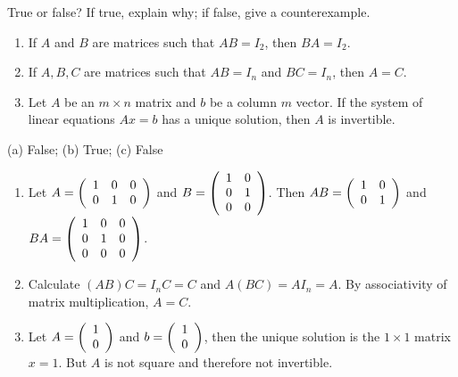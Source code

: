 \documentclass{ximera}
\author{YOUR NAME}
\begin{document}

\begin{exercise}\label{c4.9.3b.2}

True or false? If true, explain why; if false, give a counterexample.
\begin{enumerate}
\item If $A$ and $B$ are matrices such that $AB = I_2$, then $BA = I_2$.

\item If $A, B, C$ are matrices such that $AB = I_n$ and $BC = I_n$, then $A = C$.

\item Let $A$ be an $m\times n$ matrix and $b$ be a column $m$ vector.  If the system of linear equations  $Ax = b$ has a unique solution, then $A$ is invertible.
\end{enumerate}

  
\begin{solution}

\ans  (a) False; (b) True; (c) False

\soln 
\begin{enumerate}

\item Let $A = \left(\begin{array}{rrrrrrrrrrrrrrrrrr} 1 & 0 & 0\\ 0 & 1 & 0 \end{array}\right)$ and $B = \left(\begin{array}{rrrrrrrrrrrrrrrrrr} 1 & 0 \\ 0 & 1 \\ 0 & 0  \end{array}\right)$.  Then $AB = \left(\begin{array}{rrrrrrrrrrrrrrrrrr} 1 & 0 \\ 0 & 1 \end{array}\right)$ and $BA = \left(\begin{array}{rrrrrrrrrrrrrrrrrr} 1 & 0 & 0\\ 0 & 1 & 0 \\ 0 & 0 & 0 \end{array}\right)$.

\item Calculate $(AB)C = I_nC = C$ and $A(BC) = AI_n = A$.  By associativity of matrix multiplication, $A=C$.

\item Let $A = \left(\begin{array}{rrrrrrrrrrrrrrrrrr} 1\\0 \end{array}\right)$ and $b = \left(\begin{array}{rrrrrrrrrrrrrrrrrr} 1\\0 \end{array}\right)$, then the unique solution is the $1\times1$ matrix $x = 1$.  But $A$ is not square and therefore not invertible.

\end{enumerate}

\end{solution}
\end{exercise}
\end{document}
